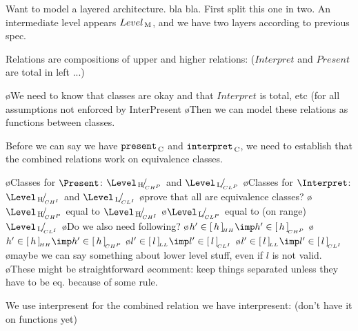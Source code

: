 Want to model a layered architecture. bla bla. First split this one in two. An intermediate level appears $Level_{\, \mathrm M}$, and we have two layers according to previous spec. 


Relations are compositions of upper and higher relations: ($Interpret$ and $Present$ are total in left ...)


\xpr{
\Present\C = \Present\L \oo \Present\H\\
\Interpret\C = \Interpret\H \oo\Interpret\L
}

\bl
\o We need to know that classes are okay and that $Interpret$ is total, etc (for all assumptions not enforced by {\sc InterPresent}
\o Then we can model these relations as functions between classes.
\el


Before we can say we have ${\tt present}_{\, \mathrm C}$ and ${\tt interpret}_{\, \mathrm C}$, we need to establish that the combined relations work on equivalence classes.

\bl
\o Classes for $\Present$: $\Eqcl{\Level\H}{CH^P}$ and $\Eqcl{\Level\L}{CL^P}$
\o Classes for $\Interpret$: $\Eqcl{\Level\H}{CH^I}$ and $\Eqcl{\Level\L}{CL^I}$
\o prove that all are equivalence classes?
\o $\Eqcl{\Level\H}{CH^P}$ equal to $\Eqcl{\Level\H}{CH^I}$
\o $\Eqcl{\Level\L}{CL^P}$ equal to (on range) $\Eqcl{\Level\L}{CL^I}$
\o Do we also need following? 
\o $h' \in \eqcl{h}{HH} \imp h' \in \eqcl{h}{CH^P}$
\o $h' \in \eqcl{h}{HH} \imp h' \in \eqcl{h}{CH^P}$
\o $l' \in \eqcl{l}{LL} \imp l' \in \eqcl{l}{CL^I}$
\o $l' \in \eqcl{l}{LL} \imp l' \in \eqcl{l}{CL^I}$
\o maybe we can say something about lower level stuff, even if  $l$ is not valid.
\o These might be straightforward
\o comment: keep things separated unless they have to be eq. because of some rule.
\el



We use interpresent for the combined relation we have interpresent: (don't have it on functions yet)

